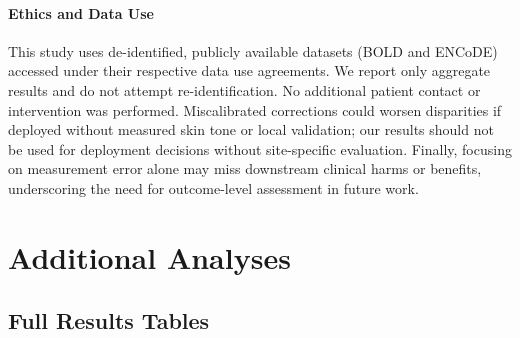 \documentclass[pmlr]{jmlr}%
\begin{document}
\paragraph{Ethics and Data Use}
This study uses de-identified, publicly available datasets (BOLD and ENCoDE) accessed under their respective data use agreements. We report only aggregate results and do not attempt re-identification. No additional patient contact or intervention was performed. Miscalibrated corrections could worsen disparities if deployed without measured skin tone or local validation; our results should not be used for deployment decisions without site-specific evaluation. Finally, focusing on measurement error alone may miss downstream clinical harms or benefits, underscoring the need for outcome-level assessment in future work.




\newpage
\appendix
\section{Additional Analyses}
\subsection{Full Results Tables}
\begin{table}[t]
  \centering
  \small
  \setlength{\tabcolsep}{3pt}
  \caption{Group counts used in fairness metrics.}
  
  \label{tab:group-counts}
\end{table}

\begin{table}[t]
  \centering
  \scriptsize
  \setlength{\tabcolsep}{2pt}
  \caption{ENCoDE race vs.\ skin tone comparison (baseline SpO\textsubscript{2} predictor; MAE and hidden hypoxemia rate at $T=92$ with 95\% patient-clustered bootstrap CIs).}
  
  \label{tab:encode-race-vs-skintone}
\end{table}

\begin{table}[t]
  \centering
  \small
  \setlength{\tabcolsep}{3pt}
  \caption{Tradeoff summary on BOLD.}
  
  \label{tab:tradeoff-bold}
\end{table}
\end{document}
